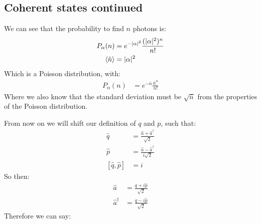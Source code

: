 \subsection{Coherent states continued}
We can see that the probability to find $n$ photons is:
\begin{align*}
	P_\alpha(n) &= e^{-|\alpha|^2} \frac{(|\alpha|^2)^n}{n!} \\
	\expval{\hat{n}} &= |\alpha|^2
\end{align*}
Which is a Poisson distribution, with:
\begin{align*}
	P_\alpha(n) &= e^{-\bar{n}} \frac{\bar{n}^n}{n!}
\end{align*}
Where we also know that the standard deviation must be $\sqrt{\bar{n}}$ from the properties of the Poisson distribution.

From now on we will shift our definition of $q$ and $p$, such that:
\begin{align*}
	\hat{q} &= \frac{\hat{a} + \hat{a}^\dagger}{\sqrt{2}} \\
	\hat{p} &= \frac{\hat{a} - \hat{a}^\dagger}{i\sqrt{2}} \\
	[\hat{q},\hat{p}] &= i
\end{align*}
So then:
\begin{align*}
	\hat{a} &= \frac{\hat{q} + i\hat{p}}{\sqrt{2}} \\
	\hat{a}^\dagger &= \frac{\hat{q} - i\hat{p}}{\sqrt{2}}
\end{align*}
Therefore we can say:
